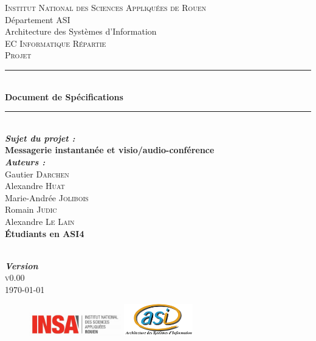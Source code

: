 \documentclass[11pt,dvipsnames,svgnames]{report}
\begin{document}
\begin{titlepage}
\newcommand{\HRule}{\rule{\linewidth}{0.5mm}} 
\center 
{}\textsc{\huge Institut National des Sciences Appliquées de Rouen}\\[0.7cm] 
\LARGE Département ASI~\\[0.5cm]
\Large{Architecture des Systèmes d'Information} ~\\[1.5cm]
\textsc{\Large EC Informatique Répartie}\\[0.5cm] 
\textsc{\large Projet}\\[0.8cm]

\HRule \\[0.4cm]
{ \huge \bfseries Document de Spécifications}\\[0.2cm] \HRule \\[1.5cm]
 
\LARGE \emph{\textbf{Sujet du projet :}} \\
\textbf{Messagerie instantanée et visio/audio-conférence}\\[1.3cm]

\large
	\emph{\textbf{Auteurs :}}\\
	Gautier \textsc{Darchen} \\ 
	Alexandre \textsc{Huat} \\ 
	Marie-Andrée \textsc{Jolibois} \\ 
	Romain \textsc{Judic} \\ 
	Alexandre \textsc{Le Lain}\\[0.3cm]
	\textbf{Étudiants en ASI4}
	
~\\[0.5cm]
\Large \emph{\textbf{Version}}\\
	\textsc{v0.00}
~\\[1cm]

\vfill{\today} 

\begin{figure}
\includegraphics[width=4cm]{images/LogoINSA.png}\hfill
\includegraphics[width=3cm]{images/logoasi.png}
\end{figure}


 \end{titlepage}
\end{document}
